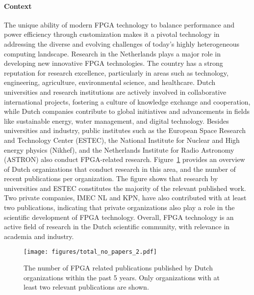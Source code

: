 

\paragraph{Context} The unique ability of modern FPGA technology to balance performance and power efficiency through customization makes it a pivotal technology in addressing the diverse and evolving challenges of today's highly heterogeneous computing landscape. Research in the Netherlands plays a major role in developing new innovative FPGA technologies. The country has a strong reputation for research excellence, particularly in areas such as technology, engineering, agriculture, environmental science, and healthcare. Dutch universities and research institutions are actively involved in collaborative international projects, fostering a culture of knowledge exchange and cooperation, while Dutch companies contribute to global initiatives and advancements in fields like sustainable energy, water management, and digital technology. Besides universities and industry, public institutes such as the European Space Research and Technology Center (ESTEC), the National Institute for Nuclear and High energy physics (Nikhef), and the Netherlands Institute for Radio Astronomy (ASTRON) also conduct FPGA-related research. Figure~\ref{fig:org-publications} provides an overview of Dutch organizations that conduct research in this area, and the number of recent publications per organization. 
The figure shows that %
research by universities and ESTEC constitutes the majority of the relevant published work. Two private companies, IMEC NL and KPN, have also contributed with at least two publications, indicating that private organizations also play a role in the scientific development of FPGA technology. Overall, FPGA technology is an active field of research in the Dutch scientific community, with relevance in academia and industry. 

\begin{figure}[t]
    \centering
    \texttt{[image: figures/total\_no\_papers\_2.pdf]}
    \caption{The number of FPGA related publications published by Dutch organizations within the past 5 years. Only organizations with at least two relevant publications are shown.}
    \label{fig:org-publications}
\end{figure}

